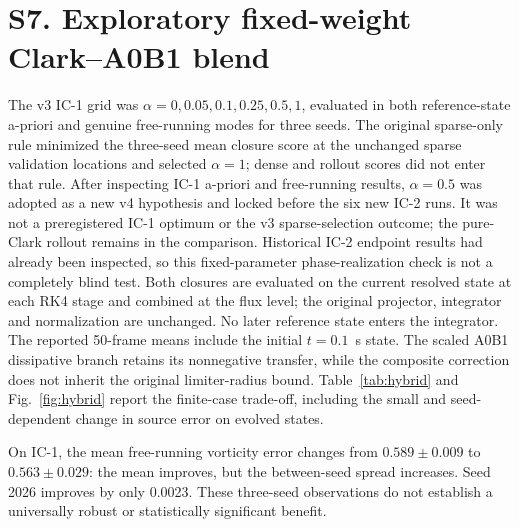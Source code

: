 \clearpage
\section*{S7. Exploratory fixed-weight Clark--A0B1 blend}
The v3 IC-1 grid was $\alpha=0,0.05,0.1,0.25,0.5,1$, evaluated in both
reference-state a-priori and genuine free-running modes for three seeds.
The original sparse-only rule minimized the three-seed mean closure score
at the unchanged sparse validation locations and selected $\alpha=1$;
dense and rollout scores did not enter that rule. After inspecting IC-1
a-priori and free-running results, $\alpha=0.5$ was adopted as a new v4
hypothesis and locked before the six new IC-2 runs. It was not a
preregistered IC-1 optimum or the v3 sparse-selection outcome; the
pure-Clark rollout remains in the comparison. Historical IC-2 endpoint results
had already been inspected, so this fixed-parameter phase-realization check
is not a completely blind test. Both closures are evaluated on the current
resolved state at each RK4 stage and combined at the flux level; the
original projector, integrator and normalization are unchanged. No later
reference state enters the integrator. The reported 50-frame means include
the initial $t=0.1$~s state. The scaled A0B1 dissipative branch retains its
nonnegative transfer, while the composite correction does not inherit the
original limiter-radius bound. Table~\ref{tab:hybrid} and
Fig.~\ref{fig:hybrid} report the finite-case trade-off, including the small
and seed-dependent change in source error on evolved states.

On IC-1, the mean free-running vorticity error changes from
$0.589\pm0.009$ to $0.563\pm0.029$: the mean improves, but the
between-seed spread increases. Seed 2026 improves by only 0.0023.
These three-seed observations do not establish a universally robust or
statistically significant benefit.

